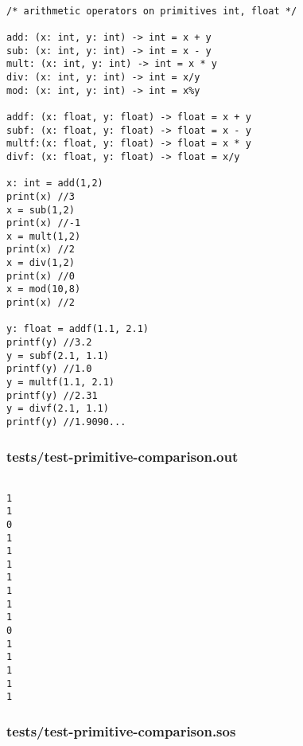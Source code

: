 \documentclass[main.tex]{subfiles}
\begin{document}
\begin{lstlisting}

/* arithmetic operators on primitives int, float */

add: (x: int, y: int) -> int = x + y
sub: (x: int, y: int) -> int = x - y
mult: (x: int, y: int) -> int = x * y
div: (x: int, y: int) -> int = x/y
mod: (x: int, y: int) -> int = x%y

addf: (x: float, y: float) -> float = x + y 
subf: (x: float, y: float) -> float = x - y 
multf:(x: float, y: float) -> float = x * y 
divf: (x: float, y: float) -> float = x/y 

x: int = add(1,2)
print(x) //3
x = sub(1,2)
print(x) //-1
x = mult(1,2)
print(x) //2
x = div(1,2)
print(x) //0
x = mod(10,8)
print(x) //2

y: float = addf(1.1, 2.1)
printf(y) //3.2
y = subf(2.1, 1.1)
printf(y) //1.0
y = multf(1.1, 2.1)
printf(y) //2.31
y = divf(2.1, 1.1)
printf(y) //1.9090...
\end{lstlisting}

\subsubsection{tests/test-primitive-comparison.out}

\begin{lstlisting}

1
1
0
1
1
1
1
1
1
1
0
1
1
1
1
1
\end{lstlisting}

\subsubsection{tests/test-primitive-comparison.sos}
\end{document}
